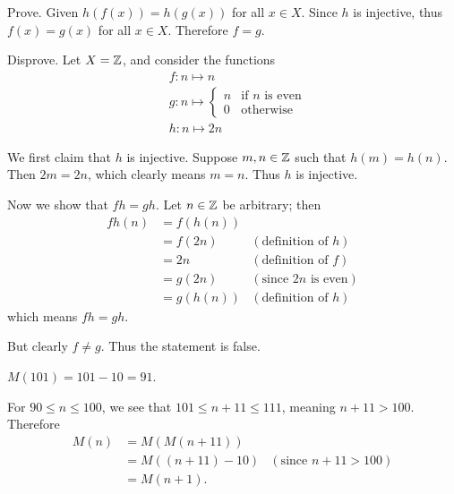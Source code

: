 \begin{questions}
    \item \begin{partquestions}{\alph*}
        \item Prove. Given $h(f(x)) = h(g(x))$ for all $x \in X$. Since $h$ is injective, thus $f(x) = g(x)$ for all $x \in X$. Therefore $f = g$.
        \item Disprove. Let $X = \mathbb{Z}$, and consider the functions
        \begin{align*}
            &f: n \mapsto n\\
            &g: n \mapsto \begin{cases}
                n & \text{if } n \text{ is even}\\
                0 & \text{otherwise}
            \end{cases}\\
            &h: n \mapsto 2n
        \end{align*}
        
        We first claim that $h$ is injective. Suppose $m,n\in\mathbb{Z}$ such that $h(m) = h(n)$. Then $2m = 2n$, which clearly means $m = n$. Thus $h$ is injective.

        Now we show that $fh = gh$. Let $n \in \mathbb{Z}$ be arbitrary; then
        \begin{align*}
            fh(n) &= f(h(n))\\
            &= f(2n) & (\text{definition of } h)\\
            &= 2n & (\text{definition of } f)\\
            &= g(2n) & (\text{since } 2n \text{ is even})\\
            &= g(h(n)) & (\text{definition of } h)
        \end{align*}
        which means $fh = gh$.

        But clearly $f \neq g$. Thus the statement is false.
    \end{partquestions}

    \item \begin{partquestions}{\roman*}
        \item $M(101) = 101 - 10 = 91$.
        
        \item For $90 \leq n \leq 100$, we see that $101 \leq n+11 \leq 111$, meaning $n+11 > 100$. Therefore
        \begin{align*}
            M(n) &= M(M(n+11))\\
            &= M((n+11) - 10) & (\text{since } n+11 > 100)\\
            &= M(n+1).
        \end{align*}


\end{partquestions}
\end{questions}
